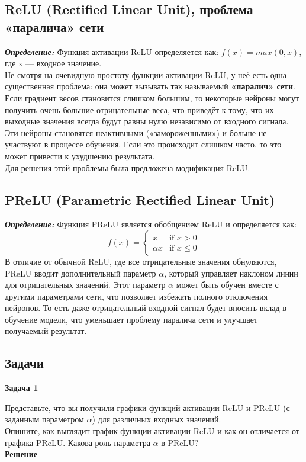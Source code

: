 \subsection{ReLU (Rectified Linear Unit), проблема «паралича» сети}

\textbf{\textit{Определение:}}
Функция активации ReLU определяется как:
$f(x) = max(0, x)$, где x — входное значение.\\
Не смотря на очевидную простоту функции активации ReLU, у неё есть одна существенная проблема: она может вызывать так называемый \textbf{«паралич» сети}.\\
Если градиент весов становится слишком большим, то некоторые нейроны могут получить очень большие отрицательные веса, что приведёт к тому, что их выходные значения всегда будут равны нулю независимо от входного сигнала. Эти нейроны становятся неактивными («замороженными») и больше не участвуют в процессе обучения. Если это происходит слишком часто, то это может привести к ухудшению результата.\\
Для решения этой проблемы была предложена модификация ReLU.
\subsection{PReLU (Parametric Rectified Linear Unit)}

\textbf{\textit{Определение:}}
Функция PReLU является обобщением ReLU и определяется как:
$$ f(x) = \begin{cases}
		x        & \text{if } x > 0    \\
		\alpha x & \text{if } x \leq 0
	\end{cases} $$
В отличие от обычной ReLU, где все отрицательные значения обнуляются, PReLU вводит дополнительный параметр $\alpha$, который управляет наклоном линии для отрицательных значений. Этот параметр $\alpha$ может быть обучен вместе с другими параметрами сети, что позволяет избежать полного отключения нейронов. То есть даже отрицательный входной сигнал будет вносить вклад в обучение модели, что уменьшает проблему паралича сети и улучшает получаемый результат.

\subsection{Задачи}
\textbf{Задача 1}

Представьте, что вы получили графики функций активации ReLU и PReLU (с заданным параметром $\alpha$) для различных входных значений.\\
Опишите, как выглядит график функции активации ReLU и как он отличается от графика PReLU. Какова роль параметра $\alpha$ в PReLU?\\
\textbf{Решение}

